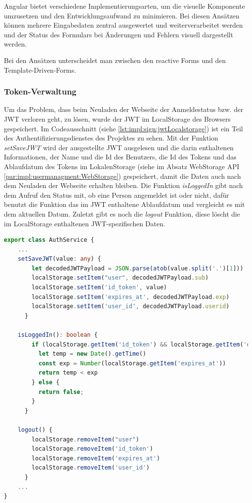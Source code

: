 Angular bietet verschiedene Implementierungsarten, um die visuelle Komponente umzusetzen und den Entwicklungsaufwand zu minimieren. Bei diesen Ansätzen können mehrere Eingabedaten zentral ausgewertet und weiterverarbeitet werden und der Status des Formulars bei Änderungen und Fehlern visuell dargestellt werden. \cite[Bookmonkey - 12 Formularverarbeitung und
Validierung: Iteration IV]{AngularBuch}

Bei den Ansätzen unterscheidet man zwischen den reactive Forms und den Template-Driven-Forms.

\subsubsection{Token-Verwaltung}
Um das Problem, dass beim Neuladen der Webseite der Anmeldestatus bzw. der JWT verloren geht, zu lösen, wurde der JWT im LocalStorage des Browsers gespeichert. Im Codeausschnitt (siehe \ref{lst:impl:sign:jwtLocalstorage}) ist ein Teil des Authentifizierungsdienstes des Projektes zu sehen. Mit der Funktion \emph{setSaveJWT} wird der ausgestellte JWT ausgelesen und die darin enthaltenen Informationen, der Name und die Id des Benutzers, die Id des Tokens und das Ablaufdatum des Tokens im LokalenStorage (siehe im Absatz WebStorage API \ref{par:impl:usermanagment:WebStorage}) gespeichert, damit die Daten auch nach dem Neuladen der Webseite erhalten bleiben. Die Funktion \emph{isLoggedIn} gibt nach dem Aufruf den Status mit, ob eine Person angemeldet ist oder nicht, dafür benutzt die Funktion das im JWT enthaltene Ablaufdatum und vergleicht es mit dem aktuellen Datum. Zuletzt gibt es noch die \emph{logout} Funktion, diese löscht die im LocalStorage enthaltenen JWT-spezifischen Daten.

\begin{lstlisting}[caption=auth.service.ts - JWT und Localstorage,label=lst:impl:sign:jwtLocalstorage,language=TypeScript ]
export class AuthService {
    ...
    setSaveJWT(value: any) {
        let decodedJWTPayload = JSON.parse(atob(value.split('.')[1]))
        localStorage.setItem("user", decodedJWTPayload.sub)
        localStorage.setItem('id_token', value)
        localStorage.setItem('expires_at', decodedJWTPayload.exp)
        localStorage.setItem('user_id', decodedJWTPayload.userid)
      }

    isLoggedIn(): boolean {
        if (localStorage.getItem('id_token') && localStorage.getItem('expires_at')) {
          let temp = new Date().getTime()
          const exp = Number(localStorage.getItem('expires_at'))
          return temp < exp
        } else {
          return false;
        }
      }

    logout() {
        localStorage.removeItem("user")
        localStorage.removeItem('id_token')
        localStorage.removeItem('expires_at')
        localStorage.removeItem('user_id')
      }
    ...
}        
\end{lstlisting}

